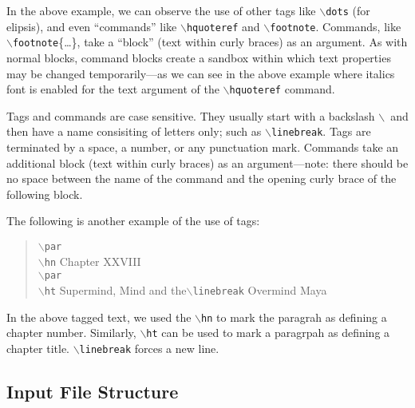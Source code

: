 \documentclass[11pt]{article}
\newcommand{\cmd}[1]{{\tt $\backslash$#1}}
\begin{document}
In the above example, we can observe the use of other tags like
\cmd{dots} (for elipsis), and even ``commands'' like \cmd{hquoteref}
and \cmd{footnote}. Commands, like \cmd{footnote}\{\ldots\}, take a
``block'' (text within curly braces) as an argument. As with normal
blocks, command blocks create a sandbox within which text properties
may be changed temporarily---as we can see in the above example where
italics font is enabled for the text argument of the \cmd{hquoteref}
command.

Tags and commands are case sensitive. They usually start with a
backslash $\backslash$\ and then have a name consisiting of letters
only; such as \cmd{linebreak}. Tags are terminated by a space, a
number, or any punctuation mark. Commands take an additional block
(text within curly braces) as an argument---note: there should be no
space between the name of the command and the opening curly brace of
the following block.

\noindent The following is another example of the use of tags:
\begin{quote}
\cmd{par}\\
\cmd{hn} Chapter XXVIII\\
\cmd{par}\\
\cmd{ht} Supermind, Mind and the\cmd{linebreak} Overmind Maya
\end{quote}

In the above tagged text, we used the \cmd{hn} to mark the paragrah as
defining a chapter number. Similarly, \cmd{ht} can be used to mark a
paragrpah as defining a chapter title. \cmd{linebreak} forces a new
line.









\subsection{Input File Structure}
\end{document}
